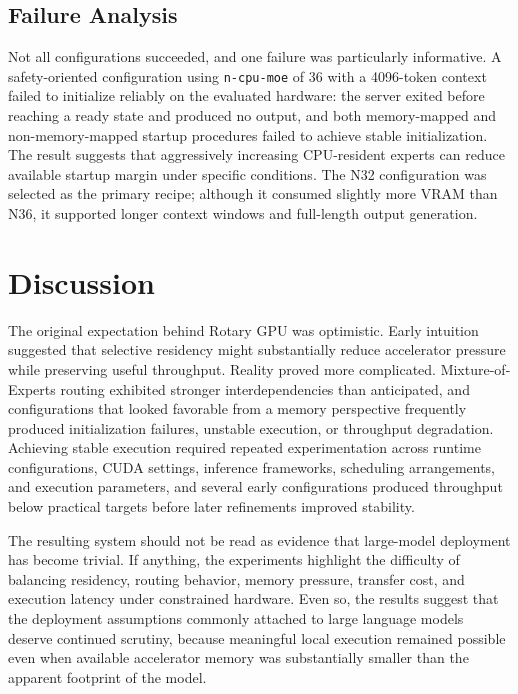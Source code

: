 \documentclass[11pt]{article}
\begin{document}
\subsection{Failure Analysis}\label{sec:fail}

Not all configurations succeeded, and one failure was particularly informative. A safety-oriented configuration using \texttt{n-cpu-moe} of 36 with a 4096-token context failed to initialize reliably on the evaluated hardware: the server exited before reaching a ready state and produced no output, and both memory-mapped and non-memory-mapped startup procedures failed to achieve stable initialization. The result suggests that aggressively increasing CPU-resident experts can reduce available startup margin under specific conditions. The N32 configuration was selected as the primary recipe; although it consumed slightly more VRAM than N36, it supported longer context windows and full-length output generation.

\section{Discussion}

The original expectation behind Rotary GPU was optimistic. Early intuition suggested that selective residency might substantially reduce accelerator pressure while preserving useful throughput. Reality proved more complicated. Mixture-of-Experts routing exhibited stronger interdependencies than anticipated, and configurations that looked favorable from a memory perspective frequently produced initialization failures, unstable execution, or throughput degradation. Achieving stable execution required repeated experimentation across runtime configurations, CUDA settings, inference frameworks, scheduling arrangements, and execution parameters, and several early configurations produced throughput below practical targets before later refinements improved stability.

The resulting system should not be read as evidence that large-model deployment has become trivial. If anything, the experiments highlight the difficulty of balancing residency, routing behavior, memory pressure, transfer cost, and execution latency under constrained hardware. Even so, the results suggest that the deployment assumptions commonly attached to large language models deserve continued scrutiny, because meaningful local execution remained possible even when available accelerator memory was substantially smaller than the apparent footprint of the model.
\end{document}
